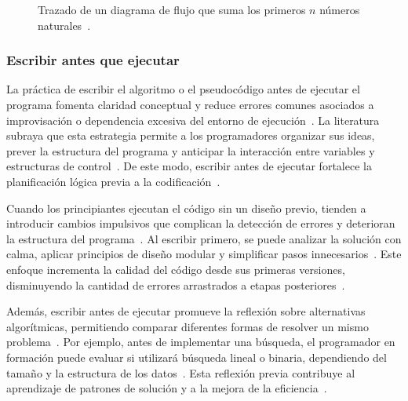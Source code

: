 \documentclass[12pt,twoside]{book}
\begin{document}
						\begin{figure}[hbt!]
							\centering
							\caption{Trazado de un diagrama de flujo que suma los primeros \(n\) números naturales~\cite{Gaddis2022Starting,Sommerville2015Software}.}
							\label{fig:trazado}
						\end{figure}
					
					\subsubsection{Escribir antes que ejecutar}
						La práctica de escribir el algoritmo o el pseudocódigo antes de ejecutar el programa fomenta claridad conceptual y reduce errores comunes asociados a improvisación o dependencia excesiva del entorno de ejecución~\cite{Pressman2019Software}. La literatura subraya que esta estrategia permite a los programadores organizar sus ideas, prever la estructura del programa y anticipar la interacción entre variables y estructuras de control~\cite{Sommerville2015Software}. De este modo, escribir antes de ejecutar fortalece la planificación lógica previa a la codificación~\cite{Stallings2021Computer}.
						
						Cuando los principiantes ejecutan el código sin un diseño previo, tienden a introducir cambios impulsivos que complican la detección de errores y deterioran la estructura del programa~\cite{Gaddis2022Starting}. Al escribir primero, se puede analizar la solución con calma, aplicar principios de diseño modular y simplificar pasos innecesarios~\cite{Pressman2019Software}. Este enfoque incrementa la calidad del código desde sus primeras versiones, disminuyendo la cantidad de errores arrastrados a etapas posteriores~\cite{Sommerville2015Software}.
						
						Además, escribir antes de ejecutar promueve la reflexión sobre alternativas algorítmicas, permitiendo comparar diferentes formas de resolver un mismo problema~\cite{Stallings2021Computer}. Por ejemplo, antes de implementar una búsqueda, el programador en formación puede evaluar si utilizará búsqueda lineal o binaria, dependiendo del tamaño y la estructura de los datos~\cite{Tanenbaum2021Structured}. Esta reflexión previa contribuye al aprendizaje de patrones de solución y a la mejora de la eficiencia~\cite{Pressman2019Software}.
						
\end{document}
